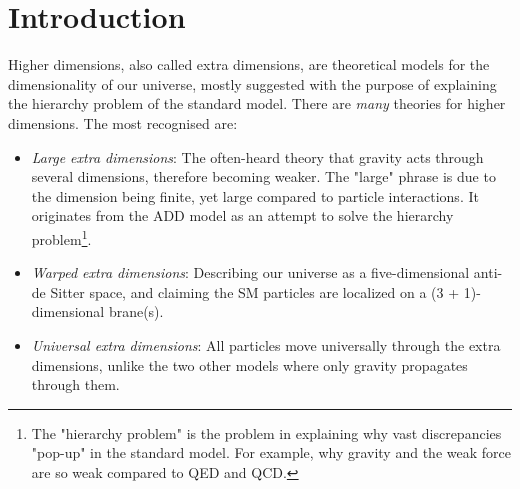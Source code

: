 \documentclass[11pt,a4paper]{article}
\begin{document}
\section{Introduction}
Higher dimensions, also called extra dimensions, are theoretical models for the dimensionality of our universe, mostly suggested with the purpose of explaining the hierarchy problem of the standard model. There are \emph{many} theories for higher dimensions. The most recognised are:
\begin{itemize}
	\item \emph{Large extra dimensions}: The often-heard theory that gravity acts through several dimensions, therefore becoming weaker. The "large" phrase is due to the dimension being finite, yet large compared to particle interactions. It originates from the ADD model as an attempt to solve the hierarchy problem\footnote{The "hierarchy problem" is the problem in explaining why vast discrepancies "pop-up" in the standard model. For example, why gravity and the weak force are so weak compared to QED and QCD.}.
	\item \emph{Warped extra dimensions}: Describing our universe as a five-dimensional anti-de Sitter space, and claiming the SM particles are localized on a (3 + 1)-dimensional brane(s).
	\item \emph{Universal extra dimensions}: All particles move universally through the extra dimensions, unlike the two other models where only gravity propagates through them.
\end{itemize}
\end{document}
